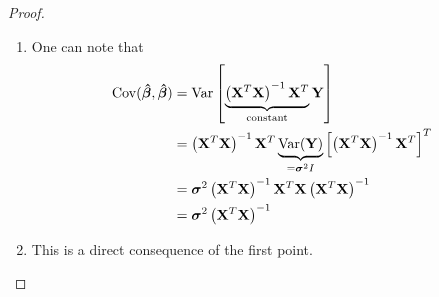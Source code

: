 \begin{proof}
    \begin{enumerate}[label=(\roman*)]

        \item One can note that\begin{align*}
                  \operatorname{Cov}(\boldsymbol{\hat{\beta}}, \boldsymbol{\hat{\beta}})
                   & = \operatorname{Var} \left[ \underbrace{\left(\mathbf{X}^T \mathbf{X}\right)^{-1} \mathbf{X}^T}_{\text{constant}} \mathbf{Y}\right]                               \\
                   & = \left(\mathbf{X}^T \mathbf{X}\right)^{-1} \mathbf{X}^T \underbrace{\operatorname{Var}(\mathbf{Y})}_{= \boldsymbol{\sigma}^2 I} \left[\left( \mathbf{X}^T \mathbf{X} \right)^{-1} \mathbf{X}^T\right]^T \\
                   & = \boldsymbol{\sigma}^{2}\left(\mathbf{X}^T \mathbf{X}\right)^{-1} \mathbf{X}^T \mathbf{X}\left(\mathbf{X}^T \mathbf{X}\right)^{-1}                                                \\
                   & = \boldsymbol{\sigma}^{2}\left(\mathbf{X}^T \mathbf{X}\right)^{-1}
              \end{align*}
        \item This is a direct consequence of the first point.
    \end{enumerate}
\end{proof}

